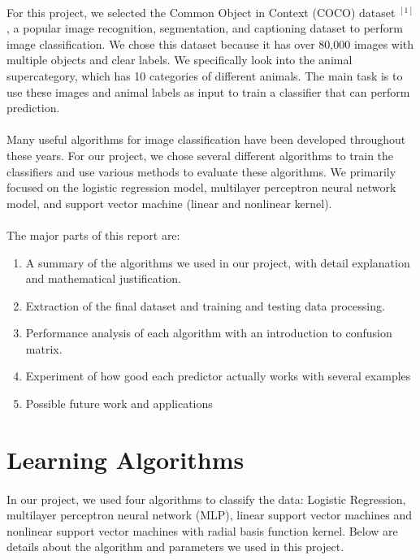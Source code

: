 \documentclass{article}
\begin{document}
\paragraph{}
For this project, we selected the Common Object in Context (COCO) dataset $^{[1]}$, a popular image recognition, segmentation, and captioning dataset to perform image classification. We chose this dataset because it has over 80,000 images with multiple objects and clear labels. We specifically look into the animal supercategory, which has 10 categories of different animals. The main task is to use these images and animal labels as input to train a classifier that can perform prediction.
\paragraph{}
Many useful algorithms for image classification have been developed throughout these years. For our project, we chose several different algorithms to train the classifiers and use various methods to evaluate these algorithms. We primarily focused on the logistic regression model, multilayer perceptron neural network model, and support vector machine (linear and nonlinear kernel).
 
\paragraph{}
The major parts of this report are:
\begin{enumerate}
\item 
A summary of the algorithms we used in our project, with detail explanation and mathematical justification.
\item 
Extraction of the final dataset and training and testing data processing.
\item 
Performance analysis of each algorithm with an introduction to confusion matrix.
\item 
Experiment of how good each predictor actually works with several examples
\item 
Possible future work and applications
\end{enumerate}

\section{Learning Algorithms}
\paragraph{}
In our project, we used four algorithms to classify the data: Logistic Regression, multilayer perceptron neural network (MLP), linear support vector machines and nonlinear support vector machines with radial basis function kernel. Below are details about the algorithm and parameters we used in this project. 
\end{document}
